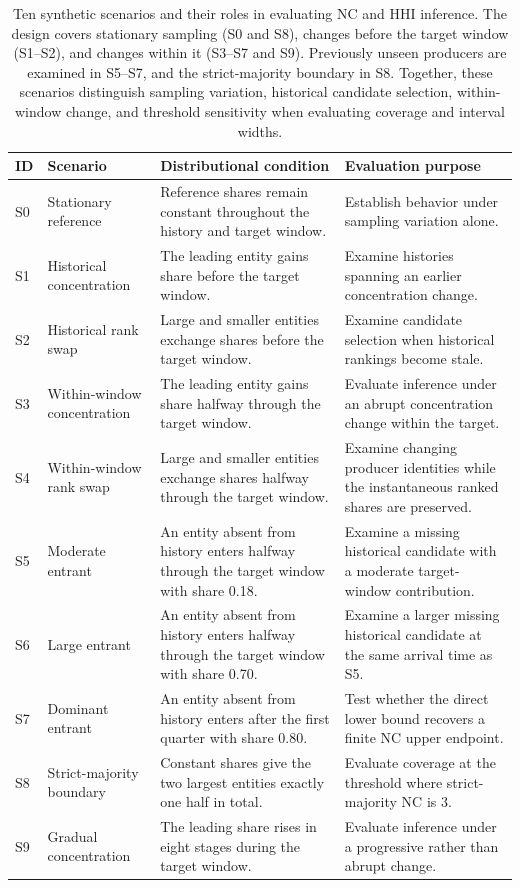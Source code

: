 \begin{table}[!t]
\centering
\small
\caption{Ten synthetic scenarios and their roles in evaluating NC and HHI inference. The design covers stationary sampling (S0 and S8), changes before the target window (S1--S2), and changes within it (S3--S7 and S9). Previously unseen producers are examined in S5--S7, and the strict-majority boundary in S8. Together, these scenarios distinguish sampling variation, historical candidate selection, within-window change, and threshold sensitivity when evaluating coverage and interval widths.}
\label{tab:scenario-overview}
\setlength{\tabcolsep}{4pt}
\renewcommand{\arraystretch}{1.08}
\begin{tabular}{@{}>{\raggedright\arraybackslash}p{}>{\raggedright\arraybackslash}p{}>{\raggedright\arraybackslash}p{}>{\raggedright\arraybackslash}p{}@{}}
\toprule
ID & Scenario & Distributional condition & Evaluation purpose \\
\midrule
S0 & Stationary reference & Reference shares remain constant throughout the history and target window. & Establish behavior under sampling variation alone. \\
S1 & Historical concentration & The leading entity gains share before the target window. & Examine histories spanning an earlier concentration change. \\
S2 & Historical rank swap & Large and smaller entities exchange shares before the target window. & Examine candidate selection when historical rankings become stale. \\
S3 & Within-window concentration & The leading entity gains share halfway through the target window. & Evaluate inference under an abrupt concentration change within the target. \\
S4 & Within-window rank swap & Large and smaller entities exchange shares halfway through the target window. & Examine changing producer identities while the instantaneous ranked shares are preserved. \\
S5 & Moderate entrant & An entity absent from history enters halfway through the target window with share 0.18. & Examine a missing historical candidate with a moderate target-window contribution. \\
S6 & Large entrant & An entity absent from history enters halfway through the target window with share 0.70. & Examine a larger missing historical candidate at the same arrival time as S5. \\
S7 & Dominant entrant & An entity absent from history enters after the first quarter with share 0.80. & Test whether the direct lower bound recovers a finite NC upper endpoint. \\
S8 & Strict-majority boundary & Constant shares give the two largest entities exactly one half in total. & Evaluate coverage at the threshold where strict-majority NC is 3. \\
S9 & Gradual concentration & The leading share rises in eight stages during the target window. & Evaluate inference under a progressive rather than abrupt change. \\
\bottomrule
\end{tabular}
\end{table}

